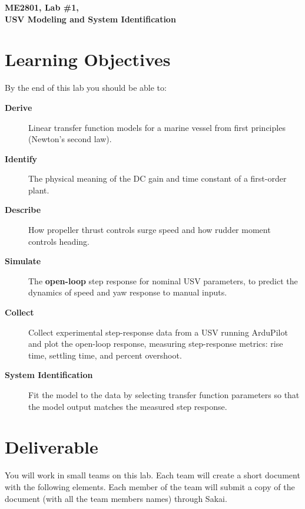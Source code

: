 \documentclass[11pt]{article}
\begin{document}
\begin{center}
  \huge{\bf ME2801, Lab \#1, \\ USV Modeling and System Identification}
\end{center}
\section{Learning Objectives}

By the end of this lab you should be able to:

\begin{description}
  \item[\textbf{Derive}] Linear transfer function models for a marine vessel from first principles (Newton's second law).
  \item[\textbf{Identify}] The physical meaning of the DC gain and time constant of a first-order plant.
  \item[\textbf{Describe}] How propeller thrust controls surge speed and how rudder moment controls heading.
  \item[\textbf{Simulate}] The \textbf{open-loop} step response for nominal USV parameters, to predict the dynamics of speed and yaw response to manual inputs.
  \item[\textbf{Collect}] Collect experimental step-response data from a USV running ArduPilot and plot the open-loop response, measuring step-response metrics: rise time, settling time, and percent overshoot.
  \item[\textbf{System Identification}] Fit the model to the data by selecting transfer function parameters so that the model output matches the measured step response.
\end{description}


\section{Deliverable}

You will work in small teams on this lab.  Each team will create a short document with the following elements.  Each member of the team will submit a copy of the document (with all the team members names) through Sakai.
\end{document}
